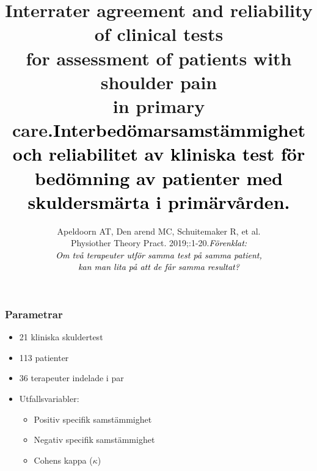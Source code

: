 \documentclass[aspectratio=169,12pt,handout,usenames,dvipsnames]{beamer}
\begin{document}
	\title{Interrater agreement and reliability of clinical tests\\ for assessment of patients with shoulder pain\\ in primary care.}
	\subtitle{Apeldoorn AT, Den arend MC, Schuitemaker R, et al. \\
			  Physiother Theory Pract. 2019;:1-20.}
	\date{}
	\frame[plain]{\maketitle}

\title{\textcolor{black}{Interbedömarsamstämmighet och reliabilitet av kliniska test för bedömning av patienter med skuldersmärta i primärvården.}}

\subtitle{\vspace{5ex}\textcolor{black}{\textit{Förenklat:\\Om två terapeuter utför samma test på samma patient,\\ kan man lita på att de får samma resultat?}}}
	\frame[plain]{\maketitle}
	
	\begin{frame}
		\frametitle{Parametrar}
		\begin{itemize}
			\item 21 kliniska skuldertest
			\item 113 patienter
			\item 36 terapeuter indelade i par
			\item Utfallsvariabler:
			\begin{itemize}
				\item Positiv specifik samstämmighet
				\item Negativ specifik samstämmighet
				\item Cohens kappa ($\kappa$)
			\end{itemize}
		\end{itemize}
	\end{frame}
	
\end{document}
